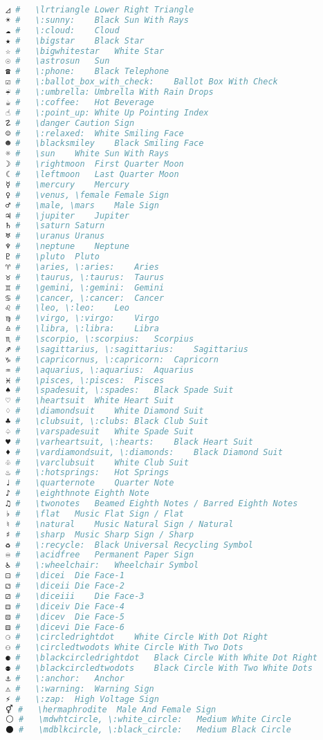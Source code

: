 \begin{lstlisting}[language=Julia, linewidth=\textwidth]
◿ #   \lrtriangle Lower Right Triangle
☀ #   \:sunny:    Black Sun With Rays
☁ #   \:cloud:    Cloud
★ #   \bigstar    Black Star
☆ #   \bigwhitestar   White Star
☉ #   \astrosun   Sun
☎ #   \:phone:    Black Telephone
☑ #   \:ballot_box_with_check:    Ballot Box With Check
☔ #   \:umbrella: Umbrella With Rain Drops
☕ #   \:coffee:   Hot Beverage
☝ #   \:point_up: White Up Pointing Index
☡ #   \danger Caution Sign
☺ #   \:relaxed:  White Smiling Face
☻ #   \blacksmiley    Black Smiling Face
☼ #   \sun    White Sun With Rays
☽ #   \rightmoon  First Quarter Moon
☾ #   \leftmoon   Last Quarter Moon
☿ #   \mercury    Mercury
♀ #   \venus, \female Female Sign
♂ #   \male, \mars    Male Sign
♃ #   \jupiter    Jupiter
♄ #   \saturn Saturn
♅ #   \uranus Uranus
♆ #   \neptune    Neptune
♇ #   \pluto  Pluto
♈ #   \aries, \:aries:    Aries
♉ #   \taurus, \:taurus:  Taurus
♊ #   \gemini, \:gemini:  Gemini
♋ #   \cancer, \:cancer:  Cancer
♌ #   \leo, \:leo:    Leo
♍ #   \virgo, \:virgo:    Virgo
♎ #   \libra, \:libra:    Libra
♏ #   \scorpio, \:scorpius:   Scorpius
♐ #   \sagittarius, \:sagittarius:    Sagittarius
♑ #   \capricornus, \:capricorn:  Capricorn
♒ #   \aquarius, \:aquarius:  Aquarius
♓ #   \pisces, \:pisces:  Pisces
♠ #   \spadesuit, \:spades:   Black Spade Suit
♡ #   \heartsuit  White Heart Suit
♢ #   \diamondsuit    White Diamond Suit
♣ #   \clubsuit, \:clubs: Black Club Suit
♤ #   \varspadesuit   White Spade Suit
♥ #   \varheartsuit, \:hearts:    Black Heart Suit
♦ #   \vardiamondsuit, \:diamonds:    Black Diamond Suit
♧ #   \varclubsuit    White Club Suit
♨ #   \:hotsprings:   Hot Springs
♩ #   \quarternote    Quarter Note
♪ #   \eighthnote Eighth Note
♫ #   \twonotes   Beamed Eighth Notes / Barred Eighth Notes
♭ #   \flat   Music Flat Sign / Flat
♮ #   \natural    Music Natural Sign / Natural
♯ #   \sharp  Music Sharp Sign / Sharp
♻ #   \:recycle:  Black Universal Recycling Symbol
♾ #   \acidfree   Permanent Paper Sign
♿ #   \:wheelchair:   Wheelchair Symbol
⚀ #   \dicei  Die Face-1
⚁ #   \diceii Die Face-2
⚂ #   \diceiii    Die Face-3
⚃ #   \diceiv Die Face-4
⚄ #   \dicev  Die Face-5
⚅ #   \dicevi Die Face-6
⚆ #   \circledrightdot    White Circle With Dot Right
⚇ #   \circledtwodots White Circle With Two Dots
⚈ #   \blackcircledrightdot   Black Circle With White Dot Right
⚉ #   \blackcircledtwodots    Black Circle With Two White Dots
⚓ #   \:anchor:   Anchor
⚠ #   \:warning:  Warning Sign
⚡ #   \:zap:  High Voltage Sign
⚥ #   \hermaphrodite  Male And Female Sign
⚪ #   \mdwhtcircle, \:white_circle:   Medium White Circle
⚫ #   \mdblkcircle, \:black_circle:   Medium Black Circle

\end{lstlisting}
